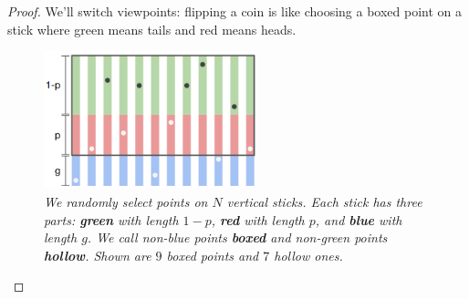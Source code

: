 \documentclass[openany, notitlepage, justified]{tufte-book}
\theoremstyle{plain}
\theoremstyle{definition}
\begin{document}
        \begin{proof}
            We'll switch viewpoints: flipping a coin is like choosing a boxed
            point on a stick where green means tails and red means heads.

            \begin{figure}[h!]
                \centering
                \includegraphics[height=4cm]{chernoff}
                \caption{\emph{
                    We randomly select points on $N$ vertical sticks.  Each
                    stick has three parts: \textbf{green} with length $1-p$,
                    \textbf{red} with length $p$, and \textbf{blue} with length
                    $g$.  We call non-blue points \textbf{boxed} and non-green
                    points \textbf{hollow}.
                    Shown are $9$ boxed points and $7$ hollow ones.
                }}
            \end{figure}


\end{proof}
\end{document}
